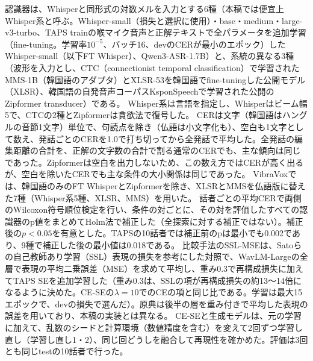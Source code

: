 \documentclass[xelatex,ja=standard,a4paper,twocolumn,10pt]{bxjsarticle}
\makeatletter
\renewcommand{\section}{\@startsection{section}{1}{\z@}{1.0ex plus .3ex}{.5ex}{\normalfont\large\sffamily\bfseries}}
\makeatother
\begin{document}
認識器は、Whisperと同形式の対数メルを入力とする6種（本稿では便宜上Whisper系と呼ぶ。Whisper-small（損失と選択に使用）・base・medium・large-v3-turbo、TAPS trainの喉マイク音声と正解テキストで全パラメータを追加学習（fine-tuning。学習率$10^{-5}$、バッチ16、devのCERが最小のエポック）したWhisper-small（以下FT Whisper）、Qwen3-ASR-1.7B\cite{qwen3asr}）と、系統の異なる3種（波形を入力とし、CTC（connectionist temporal classification）で学習されたMMS-1B\cite{mms}（韓国語のアダプタ）とXLSR-53\cite{xlsr}を韓国語でfine-tuningした公開モデル（XLSR）、韓国語の自発音声コーパスKsponSpeechで学習された公開のZipformer\cite{zipformer} transducer）である。
Whisper系は言語を指定し、Whisperはビーム幅5で、CTCの2種とZipformerは貪欲法で復号した。
CERは文字（韓国語はハングルの音節1文字）単位で、句読点を除き（仏語は小文字化も）、空白も1文字として数え、発話ごとのCERを1.0で打ち切ってから全発話で平均した。全発話の編集距離の合計を、正解の文字数の合計で割る通常のCERでも、主な傾向は同じであった。Zipformerは空白を出力しないため、この数え方ではCERが高く出るが、空白を除いたCERでも主な条件の大小関係は同じであった。
VibraVoxでは、韓国語のみのFT WhisperとZipformerを除き、XLSRとMMSを仏語版に替えた7種（Whisper系5種、XLSR、MMS）を用いた。
話者ごとの平均CERで両側のWilcoxon符号順位検定を行い、条件の対ごとに、その対を評価したすべての認識器のp値をまとめてHolm法で補正した（全探索に対する補正ではない）。補正後の$p<0.05$を有意とした。TAPSの10話者では補正前のpは最小でも0.002であり、9種で補正した後の最小値は0.018である。
比較手法のSSL-MSEは、Satoら\cite{sato2025}の自己教師あり学習（SSL）表現の損失を参考にした対照で、WavLM-Large\cite{wavlm}の全層で表現の平均二乗誤差（MSE）を求めて平均し、重み0.3で再構成損失に加えてTAPS SEを追加学習した（重み0.3は、SSLの項が再構成損失の約13〜14倍になるように決めた。CE-SEの$\lambda=10$でのCEの項と同じ比である。学習は最大15エポックで、devの損失で選んだ）。原典は後半の層を重み付きで平均した表現の誤差を用いており、本稿の実装とは異なる。
CE-SEと生成モデルは、元の学習に加えて、乱数のシードと計算環境（数値精度を含む）を変えて2回ずつ学習し直し（学習し直し1・2）、同じ回どうしを融合して再現性を確かめた。評価は3回とも同じtestの10話者で行った。

\section{実験結果}
\end{document}
